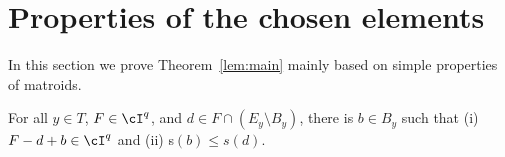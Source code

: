 \section{Properties of the chosen elements}
\label{sec:lemMainProof}

In this section we prove Theorem~\ref{lem:main} mainly based on simple properties of matroids. %

\begin{lemma}
	\label{lem:1}
	For all $y \in T$, $F \in \cI^q$, and $d \in F \cap \left(E_y \setminus B_y \right)$, there is $b \in B_y$ such that (i) $F-d+b \in \cI^q$ and (ii) s$\left(b\right) \leq s(d)$. 
\end{lemma}



